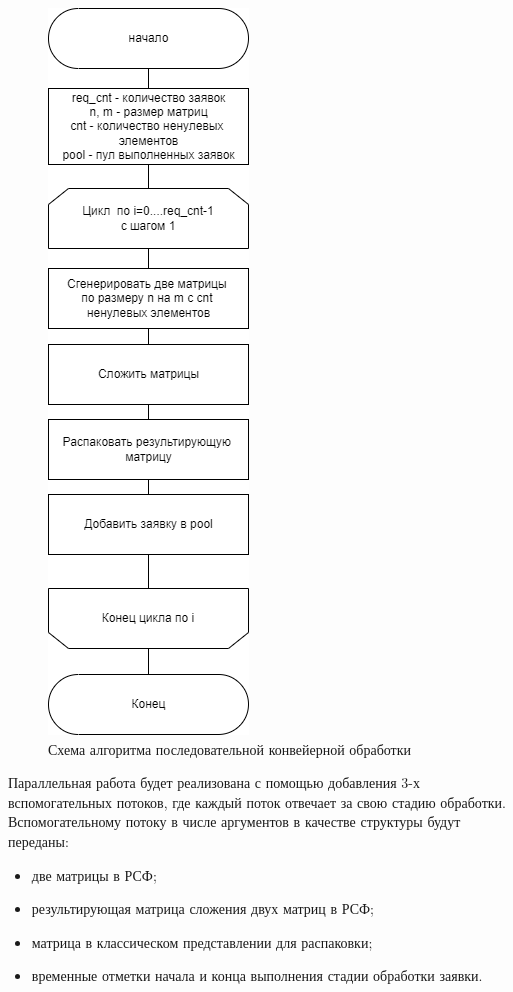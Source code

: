 \begin{figure}[h]
	\centering
	\includegraphics[height=0.85\textheight]{img/linear.png}
	\caption{Схема алгоритма последовательной конвейерной обработки}
	\label{fig:linear}
\end{figure}

\clearpage

Параллельная работа будет реализована с помощью добавления 3-х вспомогательных потоков, где каждый поток отвечает за свою стадию обработки.
Вспомогательному потоку в числе аргументов в качестве структуры будут переданы:
\begin{itemize}
	\item две матрицы в РСФ;
	\item результирующая матрица сложения двух матриц в РСФ;
	\item матрица в классическом представлении для распаковки;
	\item временные отметки начала и конца выполнения стадии обработки заявки.
\end{itemize}

